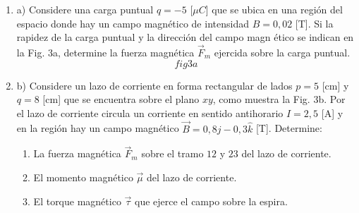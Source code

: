 \documentclass{article}
\begin{document}
\begin{enumerate}
\item[3] a) Considere una carga puntual $q=-5$ [$\mu C$] que se ubica en una
regi\'{o}n del espacio donde hay un campo magn\'{e}tico de intensidad $B=0,02
$ [T]. Si la rapidez de la carga puntual y la direcci\'{o}n del campo magn%
\'{e}tico se indican en la Fig. 3a, determine la fuerza magn\'{e}tica $\vec{F%
}_{m}$ ejercida sobre la carga puntual.%
\[
fig3a
\]

\item[3] b) Considere un lazo de corriente en forma rectangular de lados $p=5
$ [cm] y $q=8$ [cm] que se encuentra sobre el plano $xy$, como muestra la
Fig. 3b. Por el lazo de corriente circula un corriente en sentido
antihorario $I=2,5$ [A] y en la regi\'{o}n hay un campo magn\'{e}tico $\vec{B%
}=0,8j-0,3\hat{k}$ [T]. Determine:

\begin{enumerate}
\item La fuerza magn\'{e}tica  $\vec{F}_{m}$ sobre el tramo $12$ y $23$ del
lazo de corriente.

\item El momento magn\'{e}tico $\vec{\mu}$ del lazo de corriente.

\item El torque magn\'{e}tico $\vec{\tau}$ que ejerce el campo sobre la
espira.
\end{enumerate}
\end{enumerate}

\bigskip
\end{document}

